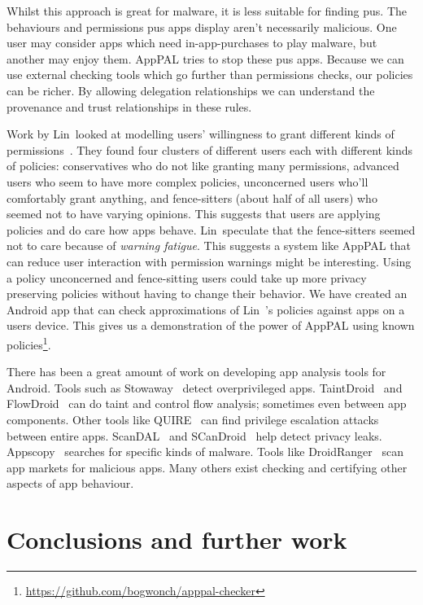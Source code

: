 \documentclass[]{llncs}
\newcommand{\comment}[1]{}%
\begin{document}
Whilst this approach is great for malware, it is less suitable for finding \ac{pus}.
The behaviours and permissions \ac{pus} apps display aren't necessarily malicious.
One user may consider apps which need in-app-purchases to play malware, but another may enjoy them.
AppPAL tries to stop these \ac{pus} apps.
Because we can use external checking tools which go further than permissions checks, our policies can be richer.
By allowing delegation relationships we can understand the provenance and trust relationships in these rules.

Work by Lin~\etal looked at modelling users' willingness to grant different kinds of permissions~\cite{Sadeh:2014vq}.
They found four clusters of different users each with different kinds of policies:
  conservatives who do not like granting many permissions,
  advanced users who seem to have more complex policies,
  unconcerned users who'll comfortably grant anything,
  and fence-sitters (about half of all users) who seemed not to have varying opinions.
This suggests that users are applying policies and do care how apps behave.
Lin~\etal speculate that the fence-sitters seemed not to care because of \emph{warning fatigue}.
This suggests a system like AppPAL that can reduce user interaction with permission warnings might be interesting.
Using a policy unconcerned and fence-sitting users could take up more privacy preserving policies without having to change their behavior.
We have created an Android app that can check approximations of Lin~\etal's policies against apps on a users device.
This gives us a demonstration of the power of AppPAL using known policies\footnote{\url{https://github.com/bogwonch/apppal-checker}}.

There has been a great amount of work on developing app analysis tools for Android.
Tools such as Stowaway~\cite{Felt:2011kj} detect overprivileged apps.
TaintDroid~\cite{Enck:2010uw} and FlowDroid~\cite{Fritz:2013vi} can do taint and control flow analysis; sometimes even between app components.
Other tools like QUIRE~\cite{Bugiel:2012ui} can find privilege escalation attacks between entire apps.
ScanDAL~\cite{Kim:2012vt} and SCanDroid~\cite{Fuchs:2009vi} help detect privacy leaks.
Appscopy~\cite{Feng:kPGZr_ja} searches for specific kinds of malware.
Tools like DroidRanger~\cite{Zhou:2012tb} scan app markets for malicious apps.
Many others exist checking and certifying other aspects of app behaviour.

\section{Conclusions and further work \comment{$\frac{1}{2}$ page}}
\end{document}

